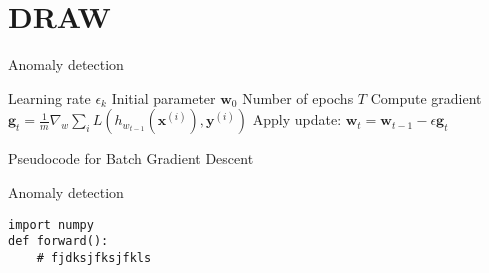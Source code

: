 \documentclass{beamer}
\begin{document}
\section{DRAW}

\begin{frame}{Anomaly detection}  
\begin{algorithm}[H]
	\begin{algorithmic}
		\REQUIRE Learning rate $\epsilon_k$
		\REQUIRE Initial parameter $\bm{w}_0$
		\REQUIRE Number of epochs $T$
		\STATE Compute gradient $\bm{g}_t=\frac{1}{m}\nabla_w\sum_i L(h_{w_{t-1}}(\bm{x}^{(i)}), \bm{y}^{(i)})$ 
		\STATE Apply update: $\bm{w}_t=\bm{w}_{t-1}-\epsilon \bm{g}_t$
		\ENDFOR
	\end{algorithmic}
	\caption{Pseudocode for Batch Gradient Descent}
	\label{alg:seq}
\end{algorithm}
\end{frame}

\begin{frame}[fragile]{Anomaly detection}
\begin{verbatim}
import numpy
def forward():
    # fjdksjfksjfkls
\end{verbatim}
\end{frame}
\end{document}
